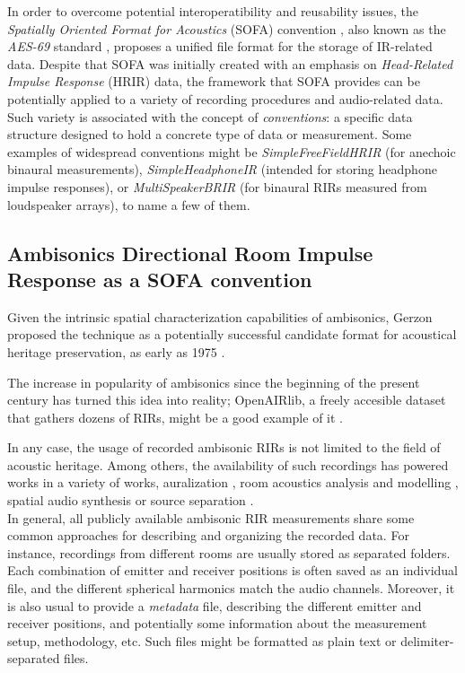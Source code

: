 In order to overcome potential interoperatibility and reusability issues, the \textit{Spatially Oriented Format for Acoustics} (SOFA) convention \cite{majdak2013spatially}, also known as the \textit{AES-69} standard \cite{majdak2015aes69}, proposes a unified file format for the storage of IR-related data. 
Despite that SOFA was initially created with an emphasis on \textit{Head-Related Impulse Response} (HRIR) data, the framework that SOFA provides can be potentially applied to a variety of recording procedures and audio-related data. 
Such variety is associated with the concept of \textit{conventions}: a specific data structure designed to hold a concrete type of data or measurement. Some examples of widespread conventions might be \textit{SimpleFreeFieldHRIR} (for anechoic binaural measurements), \textit{SimpleHeadphoneIR} (intended for storing headphone impulse responses), or \textit{MultiSpeakerBRIR} (for binaural RIRs measured from loudspeaker arrays), to name a few of them.


\subsection{Ambisonics Directional Room Impulse Response as a SOFA convention}

Given the intrinsic spatial characterization capabilities of ambisonics, Gerzon proposed the technique as a potentially successful candidate format for acoustical heritage preservation, as early as 1975 \cite{gerzon1975recording}.

The increase in popularity of ambisonics since the beginning of the present century has turned this idea into reality; OpenAIRlib, a freely accesible dataset that gathers dozens of RIRs, might be a good example of it \cite{openair}.

In any case, the usage of recorded ambisonic RIRs is not limited to the field of acoustic heritage. Among others, the availability of such recordings has powered works in a variety of works, auralization \cite{postma2016virtual}, room acoustics analysis \cite{embrechts2015measurement,clapp2011investigations} and modelling \cite{romblom2017diffuse}, spatial audio synthesis \cite{coleman2017object} or source separation \cite{baque2016separation}. \\


In general, all publicly available ambisonic RIR measurements share some common approaches for describing and organizing the recorded data. 
For instance, recordings from different rooms are usually stored as separated folders. 
Each combination of emitter and receiver positions is often saved as an individual file, and the different spherical harmonics match the audio channels.
Moreover, it is also usual to provide a \textit{metadata} file, describing the different emitter and receiver positions, and potentially some information about the measurement setup, methodology, etc. Such files might be formatted as plain text or delimiter-separated files.
 
